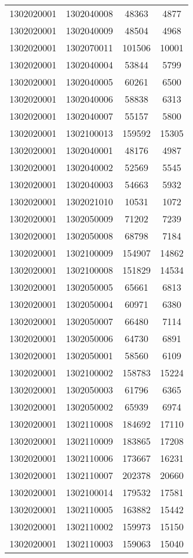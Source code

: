 \begin{longtable}{llcc}
1302020001 & 1302040008 & 48363 & 4877\\
1302020001 & 1302040009 & 48504 & 4968\\
1302020001 & 1302070011 & 101506 & 10001\\
1302020001 & 1302040004 & 53844 & 5799\\
1302020001 & 1302040005 & 60261 & 6500\\
1302020001 & 1302040006 & 58838 & 6313\\
1302020001 & 1302040007 & 55157 & 5800\\
1302020001 & 1302100013 & 159592 & 15305\\
1302020001 & 1302040001 & 48176 & 4987\\
1302020001 & 1302040002 & 52569 & 5545\\
1302020001 & 1302040003 & 54663 & 5932\\
1302020001 & 1302021010 & 10531 & 1072\\
1302020001 & 1302050009 & 71202 & 7239\\
1302020001 & 1302050008 & 68798 & 7184\\
1302020001 & 1302100009 & 154907 & 14862\\
1302020001 & 1302100008 & 151829 & 14534\\
1302020001 & 1302050005 & 65661 & 6813\\
1302020001 & 1302050004 & 60971 & 6380\\
1302020001 & 1302050007 & 66480 & 7114\\
1302020001 & 1302050006 & 64730 & 6891\\
1302020001 & 1302050001 & 58560 & 6109\\
1302020001 & 1302100002 & 158783 & 15224\\
1302020001 & 1302050003 & 61796 & 6365\\
1302020001 & 1302050002 & 65939 & 6974\\
1302020001 & 1302110008 & 184692 & 17110\\
1302020001 & 1302110009 & 183865 & 17208\\
1302020001 & 1302110006 & 173667 & 16231\\
1302020001 & 1302110007 & 202378 & 20660\\
1302020001 & 1302100014 & 179532 & 17581\\
1302020001 & 1302110005 & 163882 & 15442\\
1302020001 & 1302110002 & 159973 & 15150\\
1302020001 & 1302110003 & 159063 & 15040\\

\end{longtable}

